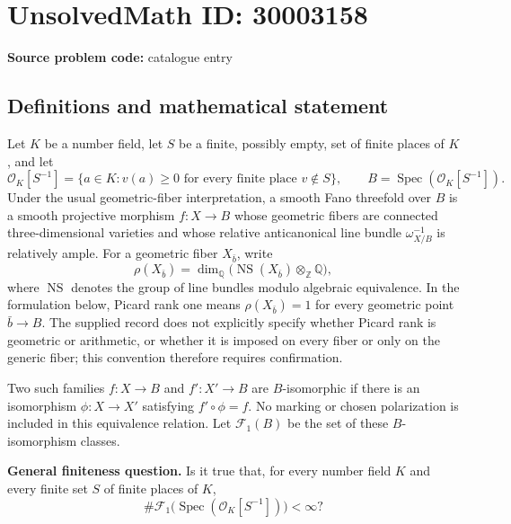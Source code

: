 \documentclass[11pt]{article}
\newcommand{\Z}{\mathbb{Z}}
\newcommand{\Q}{\mathbb{Q}}
\begin{document}
\section*{UnsolvedMath ID: 30003158}
\textbf{Source problem code:} catalogue entry
\subsection{Definitions and mathematical statement}
Let \(K\) be a number field, let \(S\) be a finite, possibly empty, set of finite places of \(K\), and let
\[
\mathcal O_K[S^{-1}]=\{a\in K:v(a)\geq 0\text{ for every finite place }v\notin S\},\qquad B=\operatorname{Spec}(\mathcal O_K[S^{-1}]).
\]
Under the usual geometric-fiber interpretation, a smooth Fano threefold over \(B\) is a smooth projective morphism \(f:X\to B\) whose geometric fibers are connected three-dimensional varieties and whose relative anticanonical line bundle \(\omega_{X/B}^{-1}\) is relatively ample. For a geometric fiber \(X_{\bar b}\), write
\[
\rho(X_{\bar b})=\dim_{\Q}\bigl(\operatorname{NS}(X_{\bar b})\otimes_{\Z}\Q\bigr),
\]
where \(\operatorname{NS}\) denotes the group of line bundles modulo algebraic equivalence. In the formulation below, Picard rank one means \(\rho(X_{\bar b})=1\) for every geometric point \(\bar b\to B\). The supplied record does not explicitly specify whether Picard rank is geometric or arithmetic, or whether it is imposed on every fiber or only on the generic fiber; this convention therefore requires confirmation.

Two such families \(f:X\to B\) and \(f':X'\to B\) are \(B\)-isomorphic if there is an isomorphism \(\phi:X\to X'\) satisfying \(f'\circ\phi=f\). No marking or chosen polarization is included in this equivalence relation. Let \(\mathcal F_1(B)\) be the set of these \(B\)-isomorphism classes.

\textbf{General finiteness question.} Is it true that, for every number field \(K\) and every finite set \(S\) of finite places of \(K\),
\[
\#\mathcal F_1\bigl(\operatorname{Spec}(\mathcal O_K[S^{-1}])\bigr)<\infty?
\]
\end{document}

